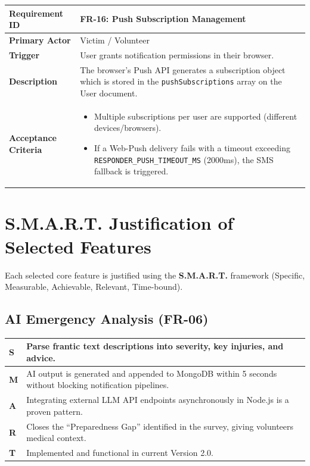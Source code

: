\documentclass[12pt,a4paper]{article}
\newcommand{\frbox}[5]{%
  \begin{table}[H]
  \centering
  \begin{tabularx}{\textwidth}{|l|X|}
  \hline
  \rowcolor{lightorange}
  \textbf{Requirement ID} & \textbf{#1} \\
  \hline
  \textbf{Primary Actor} & #2 \\
  \hline
  \textbf{Trigger} & #3 \\
  \hline
  \textbf{Description} & #4 \\
  \hline
  \rowcolor{lightorange}
  \textbf{Acceptance Criteria} & #5 \\
  \hline
  \end{tabularx}
  \end{table}
}
\begin{document}
\frbox{FR-16: Push Subscription Management}
{Victim / Volunteer}
{User grants notification permissions in their browser.}
{The browser's Push API generates a subscription object which is stored in the \texttt{pushSubscriptions} array on the User document.}
{%
\begin{itemize}[leftmargin=1.5em]
  \item Multiple subscriptions per user are supported (different devices/browsers).
  \item If a Web-Push delivery fails with a timeout exceeding \texttt{RESPONDER\_PUSH\_TIMEOUT\_MS} (2000ms), the SMS fallback is triggered.
\end{itemize}
}

\section{S.M.A.R.T. Justification of Selected Features}

Each selected core feature is justified using the \textbf{S.M.A.R.T.} framework (Specific, Measurable, Achievable, Relevant, Time-bound).

\renewcommand{\arraystretch}{1.3}

\subsection{AI Emergency Analysis (FR-06)}
\begin{tabularx}{\textwidth}{|l|X|}
\hline
\rowcolor{lightorange}
\textbf{S} & Parse frantic text descriptions into severity, key injuries, and advice. \\
\hline
\textbf{M} & AI output is generated and appended to MongoDB within 5 seconds without blocking notification pipelines. \\
\hline
\textbf{A} & Integrating external LLM API endpoints asynchronously in Node.js is a proven pattern. \\
\hline
\textbf{R} & Closes the ``Preparedness Gap'' identified in the survey, giving volunteers medical context. \\
\hline
\textbf{T} & Implemented and functional in current Version 2.0. \\
\hline
\end{tabularx}
\end{document}
